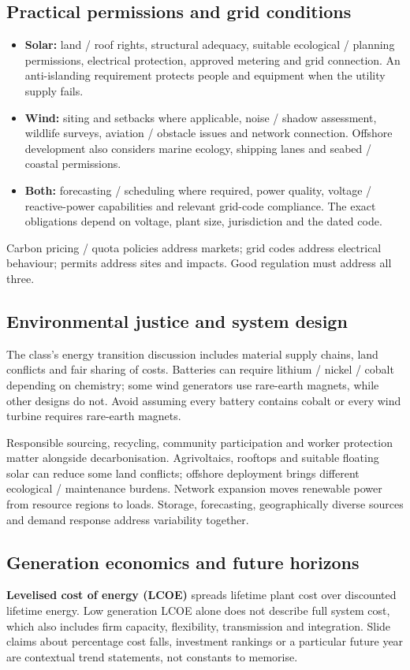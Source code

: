 \documentclass[11pt,a4paper]{article}
\begin{document}
\subsection{Practical permissions and grid conditions}
\begin{itemize}
\item \textbf{Solar:} land / roof rights, structural adequacy, suitable ecological / planning permissions, electrical protection, approved metering and grid connection. An anti-islanding requirement protects people and equipment when the utility supply fails.
\item \textbf{Wind:} siting and setbacks where applicable, noise / shadow assessment, wildlife surveys, aviation / obstacle issues and network connection. Offshore development also considers marine ecology, shipping lanes and seabed / coastal permissions.
\item \textbf{Both:} forecasting / scheduling where required, power quality, voltage / reactive-power capabilities and relevant grid-code compliance. The exact obligations depend on voltage, plant size, jurisdiction and the dated code.
\end{itemize}
Carbon pricing / quota policies address markets; grid codes address electrical behaviour; permits address sites and impacts. Good regulation must address all three.

\subsection{Environmental justice and system design}
The class's energy transition discussion includes material supply chains, land conflicts and fair sharing of costs. Batteries can require lithium / nickel / cobalt depending on chemistry; some wind generators use rare-earth magnets, while other designs do not. Avoid assuming every battery contains cobalt or every wind turbine requires rare-earth magnets.

Responsible sourcing, recycling, community participation and worker protection matter alongside decarbonisation. Agrivoltaics, rooftops and suitable floating solar can reduce some land conflicts; offshore deployment brings different ecological / maintenance burdens. Network expansion moves renewable power from resource regions to loads. Storage, forecasting, geographically diverse sources and demand response address variability together.

\subsection{Generation economics and future horizons}
\textbf{Levelised cost of energy (LCOE)} spreads lifetime plant cost over discounted lifetime energy. Low generation LCOE alone does not describe full system cost, which also includes firm capacity, flexibility, transmission and integration. Slide claims about percentage cost falls, investment rankings or a particular future year are contextual trend statements, not constants to memorise.
\end{document}

